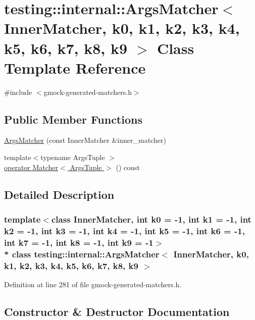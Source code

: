 \hypertarget{classtesting_1_1internal_1_1_args_matcher}{}\section{testing\+:\+:internal\+:\+:Args\+Matcher$<$ Inner\+Matcher, k0, k1, k2, k3, k4, k5, k6, k7, k8, k9 $>$ Class Template Reference}
\label{classtesting_1_1internal_1_1_args_matcher}


{\ttfamily \#include $<$gmock-\/generated-\/matchers.\+h$>$}

\subsection*{Public Member Functions}
\begin{DoxyCompactItemize}
\item 
\hyperlink{classtesting_1_1internal_1_1_args_matcher_a2879d7455f2da2a5a2f2b6759dbc0561}{Args\+Matcher} (const Inner\+Matcher \&inner\+\_\+matcher)
\item 
{\footnotesize template$<$typename Args\+Tuple $>$ }\\\hyperlink{classtesting_1_1internal_1_1_args_matcher_ae94d3e9b43d0102875a1494ca56e6d26}{operator Matcher$<$ Args\+Tuple $>$} () const 
\end{DoxyCompactItemize}


\subsection{Detailed Description}
\subsubsection*{template$<$class Inner\+Matcher, int k0 = -\/1, int k1 = -\/1, int k2 = -\/1, int k3 = -\/1, int k4 = -\/1, int k5 = -\/1, int k6 = -\/1, int k7 = -\/1, int k8 = -\/1, int k9 = -\/1$>$\\*
class testing\+::internal\+::\+Args\+Matcher$<$ Inner\+Matcher, k0, k1, k2, k3, k4, k5, k6, k7, k8, k9 $>$}



Definition at line 281 of file gmock-\/generated-\/matchers.\+h.



\subsection{Constructor \& Destructor Documentation}
